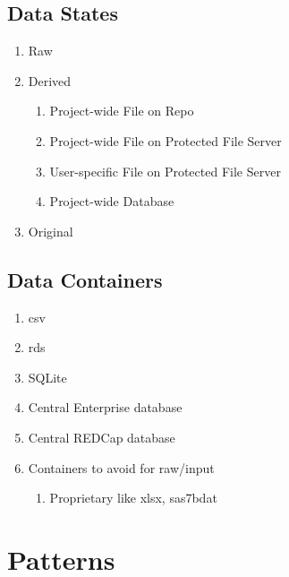 \documentclass[
]{book}
\providecommand{\tightlist}{%
  \setlength{\itemsep}{0pt}\setlength{\parskip}{0pt}}
\begin{document}
\hypertarget{data-states}{%
\section{Data States}\label{data-states}}

\begin{enumerate}
\def\labelenumi{\arabic{enumi}.}
\tightlist
\item
  Raw
\item
  Derived

  \begin{enumerate}
  \def\labelenumii{\arabic{enumii}.}
  \tightlist
  \item
    Project-wide File on Repo
  \item
    Project-wide File on Protected File Server
  \item
    User-specific File on Protected File Server
  \item
    Project-wide Database
  \end{enumerate}
\item
  Original
\end{enumerate}

\hypertarget{data-containers}{%
\section{Data Containers}\label{data-containers}}

\begin{enumerate}
\def\labelenumi{\arabic{enumi}.}
\tightlist
\item
  csv
\item
  rds
\item
  SQLite
\item
  Central Enterprise database
\item
  Central REDCap database
\item
  Containers to avoid for raw/input

  \begin{enumerate}
  \def\labelenumii{\arabic{enumii}.}
  \tightlist
  \item
    Proprietary like xlsx, sas7bdat
  \end{enumerate}
\end{enumerate}

\hypertarget{patterns}{%
\chapter{Patterns}\label{patterns}}
\end{document}
